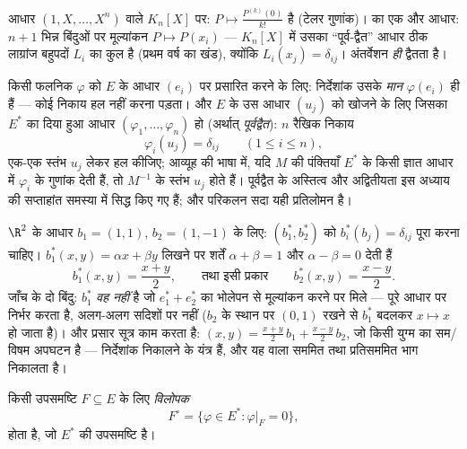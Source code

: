 \begin{example}\label{ex:b2:linalg:dualexamples}
आधार $(1, X, \dots, X^n)$ वाले $K_n[X]$ पर:  $P
\mapsto \frac{P^{(k)}(0)}{k!}$ है (टेलर गुणांक)।  का एक
और आधार: $n + 1$ भिन्न बिंदुओं पर मूल्यांकन $P \mapsto P(x_i)$ --- $K_n[X]$ में उसका
``पूर्व-द्वैत'' आधार ठीक लाग्रांज बहुपदों $L_i$ का कुल है (प्रथम वर्ष का
खंड), क्योंकि $L_i(x_j) =
\delta_{ij}$। अंतर्वेशन \emph{ही} द्वैतता है।
\end{example}

\begin{method}[व्यवहार में द्वैत और पूर्वद्वैत आधार]\label{met:b2:linalg:dualbasis}
किसी फलनिक $\varphi$ को $E$ के आधार $(e_i)$ पर प्रसारित करने के लिए: निर्देशांक
उसके \emph{मान} $\varphi(e_i)$ ही हैं --- कोई निकाय हल नहीं करना पड़ता। और $E$ के
उस आधार $(u_j)$ को खोजने के लिए जिसका  $E^*$ का दिया हुआ आधार $(\varphi_1, \dots, \varphi_n)$ हो
(अर्थात् \emph{पूर्वद्वैत}): $n$ रैखिक निकाय
\[
\varphi_i(u_j) = \delta_{ij} \qquad (1 \leq i \leq n),
\]
एक-एक स्तंभ $u_j$ लेकर हल कीजिए; आव्यूह की भाषा में, यदि $M$ की
पंक्तियाँ $E^*$ के किसी ज्ञात आधार में $\varphi_i$ के गुणांक देती हैं, तो $M^{-1}$
के स्तंभ $u_j$ होते हैं। पूर्वद्वैत के अस्तित्व और अद्वितीयता इस अध्याय
की सप्ताहांत समस्या में सिद्ध किए गए हैं; और परिकलन सदा यही प्रतिलोमन
है।
\end{method}

\begin{example}[$\R^2$ का एक द्वैत आधार, पूरा परिकलित]\label{ex:b2:linalg:dualbasis2d}
$\R^2$ के आधार $b_1 = (1, 1)$, $b_2 = (1, -1)$ के लिए:  $(b_1^*, b_2^*)$ को $b_i^*(b_j) =
\delta_{ij}$ पूरा करना चाहिए।
$b_1^*(x, y) = \alpha x + \beta y$ लिखने पर शर्तें $\alpha + \beta = 1$ और $\alpha - \beta = 0$ देती हैं
\[
b_1^*(x, y) = \frac{x + y}{2},
\qquad\text{तथा इसी प्रकार}\qquad
b_2^*(x, y) = \frac{x - y}{2} .
\]
जाँच के दो बिंदु: $b_1^*$ \emph{वह नहीं} है जो $e_1^* + e_2^*$ का भोलेपन से
मूल्यांकन करने पर मिले ---  पूरे आधार पर निर्भर करता है,
अलग-अलग सदिशों पर नहीं ($b_2$ के स्थान पर $(0, 1)$ रखने से $b_1^*$ बदलकर $x \mapsto x$
हो जाता है)। और प्रसार सूत्र काम करता है: $(x, y) = \frac{x+y}2\,b_1 + \frac{x-y}2\,b_2$, जो किसी युग्म का
सम/विषम अपघटन है ---  निर्देशांक निकालने के यंत्र हैं, और यह
वाला सममित तथा प्रतिसममित भाग निकालता है।
\end{example}

\begin{definition}[विलोपक]\label{def:b2:linalg:annihilator}
किसी उपसमष्टि $F \subseteq E$ के लिए \emph{विलोपक}
\[
F^{\circ} = \{\varphi \in E^* : \varphi|_F = 0\},
\]
होता है, जो $E^*$ की उपसमष्टि है।
\end{definition}

